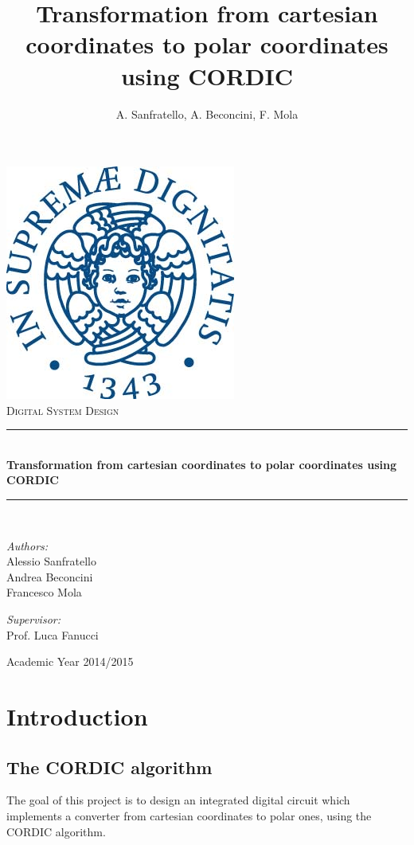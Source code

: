 \documentclass[12pt,a4paper]{report}
\author{A. Sanfratello, A. Beconcini, F. Mola}
\title{Transformation from cartesian coordinates to polar coordinates using CORDIC}
\newcommand{\HRule}{\rule{\linewidth}{0.5mm}}
\begin{document}
\begin{titlepage}
\begin{center}
	\includegraphics[scale=.60]{img/Unipi_logo.jpg}\\[3cm]
	\textsc{\Large Digital System Design}
	\HRule \\[0.4cm]
{ \huge \bfseries Transformation from cartesian coordinates to polar coordinates using CORDIC \\[0.4cm] }
	\HRule \\[4cm]
	\noindent
	\begin{minipage}{0.4\textwidth}
	\begin{flushleft} \large
	\emph{Authors:}\\
	Alessio Sanfratello\\
	Andrea Beconcini\\
	Francesco Mola 
	\end{flushleft}
	\end{minipage}%
	\begin{minipage}{0.4\textwidth}
	\begin{flushright} \large
	\emph{Supervisor:} \\
	Prof. Luca Fanucci
	\end{flushright}
	\end{minipage}

	\vfill
	{\large Academic Year 2014/2015}
\end{center}
\end{titlepage}

\tableofcontents

\chapter{Introduction}

\section{The CORDIC algorithm}
\label{sec:cordic_alghorithm}
The goal of this project is to design an integrated digital circuit which implements a converter from cartesian coordinates to polar ones, using the CORDIC algorithm.
\end{document}
